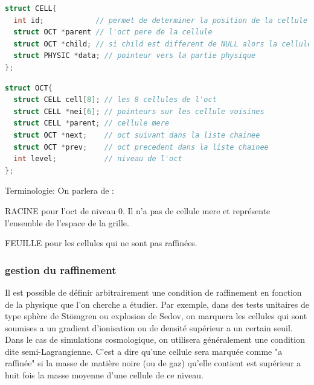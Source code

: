 \begin{lstlisting}[float=bth,language=C,frame=tb,caption={les structures cellule de EMMA},label=lst:cell]
struct CELL{
  int id;            // permet de determiner la position de la cellule dans l'oct
  struct OCT *parent // l'oct pere de la cellule
  struct OCT *child; // si child est different de NULL alors la cellule est raffinee et child point vers l'oct enfant
  struct PHYSIC *data; // pointeur vers la partie physique
};
\end{lstlisting}

\begin{lstlisting}[float=bth,language=C,frame=tb,caption={les structures OCT  de EMMA},label=lst:oct]
struct OCT{
  struct CELL cell[8]; // les 8 cellules de l'oct
  struct CELL *nei[6]; // pointeurs sur les cellule voisines
  struct CELL *parent; // cellule mere
  struct OCT *next;    // oct suivant dans la liste chainee
  struct OCT *prev;    // oct precedent dans la liste chainee
  int level;           // niveau de l'oct
};
\end{lstlisting}


Terminologie:
On parlera de :

RACINE pour l'oct de niveau 0. Il n'a pas de cellule mere et représente l'ensemble de l'espace de la grille.

FEUILLE pour les cellules qui ne sont pas raffinées. 


\subsubsection{gestion du raffinement}

Il est possible de définir arbitrairement une condition de raffinement en fonction de la physique que l'on cherche a étudier.
Par exemple, dans des tests unitaires de type sphère de Stömgren ou explosion de Sedov, on marquera les cellules qui sont soumises a un gradient d'ionisation ou de densité supérieur a un certain seuil.
Dans le cas de simulations cosmologique, on utilisera généralement une condition dite semi-Lagrangienne.
C'est a dire qu'une cellule sera marquée comme "a raffinée" si la masse de matière noire (ou de gaz) qu'elle contient est supérieur a huit fois la masse moyenne d'une cellule de ce niveau.



